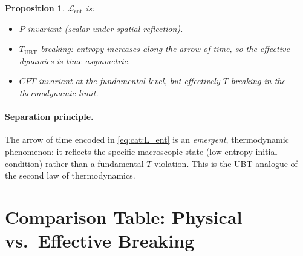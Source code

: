 \documentclass[12pt,a4paper]{article}
\newtheorem{proposition}[theorem]{Proposition}
\theoremstyle{definition}
\theoremstyle{remark}
\begin{document}
\begin{proposition}
$\mathcal{L}_{\mathrm{ent}}$ is:
\begin{itemize}
  \item $P$-invariant (scalar under spatial reflection).
  \item $T_{\mathrm{UBT}}$-\emph{breaking}: entropy increases along the
    arrow of time, so the effective dynamics is time-asymmetric.
  \item $CPT$-invariant \emph{at the fundamental level}, but
    effectively $T$-breaking in the thermodynamic limit.
\end{itemize}
\end{proposition}

\paragraph{Separation principle.}
The arrow of time encoded in \eqref{eq:cat:L_ent} is an \emph{emergent},
thermodynamic phenomenon: it reflects the specific macroscopic state
(low-entropy initial condition) rather than a fundamental $T$-violation.
This is the UBT analogue of the second law of thermodynamics.

\section{Comparison Table: Physical vs.\ Effective Breaking}
\label{sec:cat:comparison}
\end{document}
